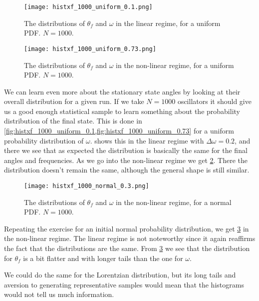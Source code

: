\documentclass[10pt,a4paper,twocolumn]{article}
\begin{document}
\begin{figure}[!h]
    \centering
    \texttt{[image: histxf\_1000\_uniform\_0.1.png]}
    \caption{The distributions of $\theta_f$ and $\omega$ in the linear regime, for a uniform PDF. $N=1000$.}
    \label{fig:histxf_1000_uniform_0.1}
\end{figure}

\begin{figure}[!t]
    \centering
    \texttt{[image: histxf\_1000\_uniform\_0.73.png]}
    \caption{The distributions of $\theta_f$ and $\omega$ in the non-linear regime, for a uniform PDF. $N=1000$.}
    \label{fig:histxf_1000_uniform_0.73}
\end{figure}

We can learn even more about the stationary state angles by looking at their overall distribution for a given run. If we take $N = 1000$ oscillators it should give us a good enough statistical sample to learn something about the probability distribution of the final state. This is done in \cref{fig:histxf_1000_uniform_0.1,fig:histxf_1000_uniform_0.73} for a uniform probability distribution of $\omega$.  shows this in the linear regime with $\Delta \omega = 0.2$, and there we see that as expected the distribution is basically the same for the final angles and frequencies. As we go into the non-linear regime we get \cref{fig:histxf_1000_uniform_0.73}. There the distribution doesn't remain the same, although the general shape is still similar.

\begin{figure}[!h]
    \centering
    \texttt{[image: histxf\_1000\_normal\_0.3.png]}
    \caption{The distributions of $\theta_f$ and $\omega$ in the non-linear regime, for a normal PDF. $N=1000$.}
    \label{fig:histxf_1000_normal_0.3}
\end{figure}

Repeating the exercise for an initial normal probability distribution, we get \cref{fig:histxf_1000_normal_0.3} in the non-linear regime. The linear regime is not noteworthy since it again reaffirms the fact that the distributions are the same. From \cref{fig:histxf_1000_normal_0.3} we see that the distribution for $\theta_f$ is a bit flatter and with longer tails than the one for $\omega$.

We could do the same for the Lorentzian distribution, but its long tails and aversion to generating representative samples would mean that the histograms would not tell us much information.
\end{document}
